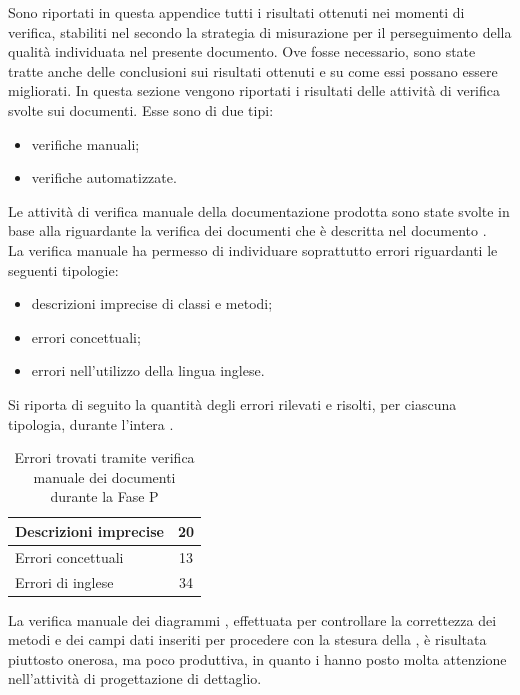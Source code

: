	Sono riportati in questa appendice tutti i risultati ottenuti nei momenti di verifica, stabiliti nel  secondo la strategia di misurazione per il perseguimento della qualità individuata nel presente documento. Ove fosse necessario, sono state tratte anche delle conclusioni sui risultati ottenuti e su come essi possano essere migliorati.
			In questa sezione vengono riportati i risultati delle attività di verifica svolte sui documenti. Esse sono di due tipi:
			\begin{itemize}
				\item verifiche manuali;
				\item verifiche automatizzate.
			\end{itemize}
				Le attività di verifica manuale della documentazione prodotta sono state svolte in base alla  riguardante la verifica dei documenti che è descritta nel documento .\\
				La verifica manuale ha permesso di individuare soprattutto errori riguardanti le seguenti tipologie:
				\begin{itemize}
					\item descrizioni imprecise di classi e metodi;
					\item errori concettuali;
					\item errori nell'utilizzo della lingua inglese.
				\end{itemize}
				Si riporta di seguito la quantità degli errori rilevati e risolti, per ciascuna tipologia, durante l'intera .
				\begin{table}[H]
					\centering
						\begin{tabu}{| l | c |}
							\hline
								Descrizioni imprecise	&	20\\ \hline
								Errori concettuali	&	13\\ \hline
								Errori di inglese  &  34\\ \hline
						\end{tabu}
						\caption{Errori trovati tramite verifica manuale dei documenti durante la Fase P}
				\end{table}
				La verifica manuale dei diagrammi , effettuata per controllare la correttezza dei metodi e dei campi dati inseriti per procedere con la stesura della , è risultata piuttosto onerosa, ma poco produttiva, in quanto i  hanno posto molta attenzione nell'attività di progettazione di dettaglio.\\
